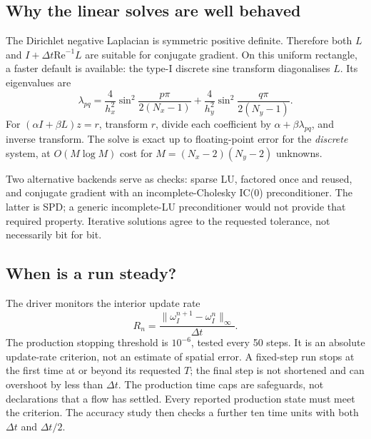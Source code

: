 \documentclass[11pt,a4paper]{article}
\newcommand{\Rey}{\mathrm{Re}}
\newcommand{\dt}{\Delta t}
\begin{document}
\subsection{Why the linear solves are well behaved}
The Dirichlet negative Laplacian is symmetric positive definite. Therefore
both $L$ and $I+\dt\Rey^{-1}L$ are suitable for conjugate gradient.
On this uniform rectangle, a faster default is available: the type-I discrete
sine transform diagonalises $L$. Its eigenvalues are
\begin{equation}
\lambda_{pq}=\frac{4}{h_x^2}\sin^2\!\frac{p\pi}{2(N_x-1)}
+\frac{4}{h_y^2}\sin^2\!\frac{q\pi}{2(N_y-1)}.
\end{equation}
For $(\alpha I+\beta L)z=r$, transform $r$, divide each coefficient by
$\alpha+\beta\lambda_{pq}$, and inverse transform. The solve is exact up to
floating-point error for the \emph{discrete} system, at
$O(M\log M)$ cost for $M=(N_x-2)(N_y-2)$ unknowns.

Two alternative backends serve as checks: sparse LU, factored once and reused,
and conjugate gradient with an incomplete-Cholesky IC(0) preconditioner.
The latter is SPD; a generic incomplete-LU preconditioner would not provide
that required property. Iterative solutions agree to the requested tolerance,
not necessarily bit for bit.

\subsection{When is a run steady?}
The driver monitors the interior update rate
\begin{equation}
R_n=\frac{\|\omega_I^{n+1}-\omega_I^n\|_\infty}{\dt}.
\end{equation}
The production stopping threshold is $10^{-6}$, tested every 50 steps.
It is an absolute update-rate criterion, not an estimate of spatial error.
A fixed-step run stops at the first time at or beyond its requested $T$;
the final step is not shortened and can overshoot by less than $\dt$.
The production time caps are safeguards, not declarations that a flow has
settled. Every reported production state must meet the criterion. The accuracy
study then checks a further ten time units with both $\dt$ and $\dt/2$.

\clearpage
\end{document}
